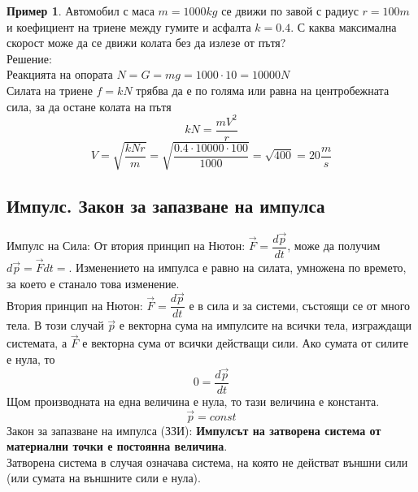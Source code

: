 \documentclass[fleqn, 12pt]{article}
\theoremstyle{definition}
\newtheorem{example}{Пример}[subsection]
\begin{document}
\begin{example}
Автомобил с маса $m = 1000 kg$ се движи по завой с радиус $r = 100 m$ и коефициент на триене между гумите и асфалта $k =0.4$. С каква максимална скорост може да се движи колата без да излезе от пътя?\\
Решение: \\
Реакцията на опората $N = G = mg = 1000 \cdot 10 = 10 000 N$\\
Силата на триене $f = kN$ трябва да е по голяма или равна на центробежната сила, за да остане колата на пътя 
$$kN =  \dfrac{mV^2}{r}$$
$$V = \sqrt{\dfrac{kNr}{m}} = \sqrt{\dfrac{0.4 \cdot 10 000 \cdot 100}{1000}} = \sqrt{400} = 20 \dfrac{m}{s}$$
\end{example}


\subsection{Импулс. Закон за запазване на импулса}

Импулс на Сила: От втория принцип на Нютон: $\vec{F} = \dfrac{d \vec{p}}{dt}$, може да получим $d \vec{p} =\vec{F}dt =$. Изменението на импулса е равно на силата, умножена по времето, за което е станало това изменение. \\
Втория принцип на Нютон: $\vec{F} = \dfrac{d \vec{p}}{dt}$ е в сила и за системи, състоящи се от много тела. В този случай $\vec{p}$ е векторна сума на импулсите на всички тела, изграждащи системата, а $\vec{F}$ е векторна сума от всички действащи сили. Ако сумата от силите е нула, то
$$0 = \dfrac{d \vec{p}}{dt}$$
Щом производната на една величина е нула, то тази величина е константа.
$$\vec{p} = const$$
Закон за запазване на импулса (ЗЗИ): \textbf{Импулсът на затворена система от материални точки е постоянна величина}.\\ 
Затворена система в случая означава система, на която не действат външни сили (или сумата на външните сили е нула).
\end{document}
